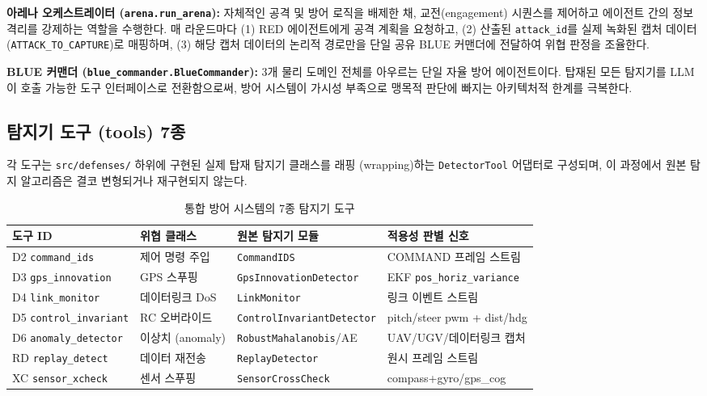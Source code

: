 \textbf{아레나 오케스트레이터 (\texttt{arena.run\_arena}):} 자체적인 공격 및 방어 로직을 배제한 채, 교전(engagement) 시퀀스를 제어하고 에이전트 간의 정보 격리를 강제하는 역할을 수행한다. 매 라운드마다 (1) RED 에이전트에게 공격 계획을 요청하고, (2) 산출된 \texttt{attack\_id}를 실제 녹화된 캡처 데이터 (\texttt{ATTACK\_TO\_CAPTURE})로 매핑하며, (3) 해당 캡처 데이터의 논리적 경로만을 단일 공유 BLUE 커맨더에 전달하여 위협 판정을 조율한다.

\textbf{BLUE 커맨더 (\texttt{blue\_commander.BlueCommander}):} 3개 물리 도메인 전체를 아우르는 단일 자율 방어 에이전트이다. 탑재된 모든 탐지기를 LLM이 호출 가능한 도구 인터페이스로 전환함으로써, 방어 시스템이 가시성 부족으로 맹목적 판단에 빠지는 아키텍처적 한계를 극복한다.

\subsection{탐지기 도구 (tools) 7종}

각 도구는 \texttt{src/defenses/} 하위에 구현된 실제 탑재 탐지기 클래스를 래핑 (wrapping)하는 \texttt{DetectorTool} 어댑터로 구성되며, 이 과정에서 원본 탐지 알고리즘은 결코 변형되거나 재구현되지 않는다.

\begin{table}[t!]
\centering
\caption{통합 방어 시스템의 7종 탐지기 도구}
\label{tab:detector_tools}
\renewcommand{\arraystretch}{1.2}
\small
\begin{tabularx}{\textwidth}{l X X X}
\toprule
\textbf{도구 ID} & \textbf{위협 클래스} & \textbf{원본 탐지기 모듈} & \textbf{적용성 판별 신호} \\
\midrule
D2 \texttt{command\_ids} & 제어 명령 주입 & \texttt{CommandIDS} & COMMAND 프레임 스트림 \\
D3 \texttt{gps\_innovation} & GPS 스푸핑 & \texttt{GpsInnovationDetector} & EKF \texttt{pos\_horiz\_variance} \\
D4 \texttt{link\_monitor} & 데이터링크 DoS & \texttt{LinkMonitor} & 링크 이벤트 스트림 \\
D5 \texttt{control\_invariant} & RC 오버라이드 & \texttt{ControlInvariantDetector} & pitch/steer pwm + dist/hdg \\
D6 \texttt{anomaly\_detector} & 이상치 (anomaly) & \texttt{RobustMahalanobis}/AE & UAV/UGV/데이터링크 캡처 \\
RD \texttt{replay\_detect} & 데이터 재전송 & \texttt{ReplayDetector} & 원시 프레임 스트림 \\
XC \texttt{sensor\_xcheck} & 센서 스푸핑 & \texttt{SensorCrossCheck} & compass+gyro/gps\_cog \\
\bottomrule
\end{tabularx}
\end{table}

